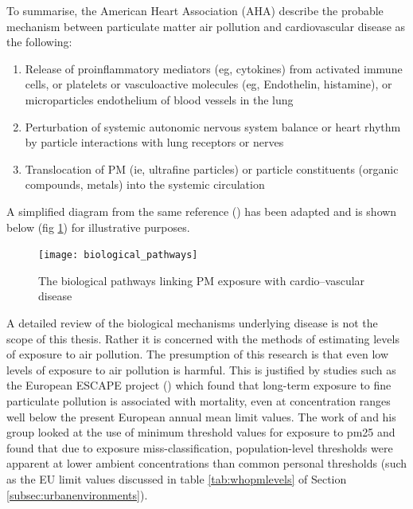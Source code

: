 To summarise, the American Heart Association (AHA) \cite{Brook2010} describe the probable mechanism between particulate matter air pollution and cardiovascular disease as the following:

\begin{enumerate}
  \item Release of proinflammatory mediators (eg, cytokines) from activated immune cells, or platelets or vasculoactive molecules (eg, Endothelin, histamine), or microparticles endothelium of blood vessels in the lung
  \item Perturbation of systemic autonomic nervous system balance or heart rhythm by particle interactions with lung receptors or nerves
  \item Translocation of PM (ie, ultrafine particles) or particle constituents (organic compounds, metals) into the systemic circulation
\end{enumerate}


A simplified diagram from the same reference (\cite{Brook2010}) has been adapted and is shown below (fig \ref{fig:biological_pathways}) for illustrative purposes.

\begin{figure}[H]
\centering
\texttt{[image: biological\_pathways]}
\caption{The biological pathways linking PM exposure with cardio--vascular disease}
\label{fig:biological_pathways}
\end{figure}


A detailed review of the biological mechanisms underlying disease is not the scope of this thesis. Rather it is concerned with the methods of estimating levels of exposure to air pollution. The presumption of this research is that even low levels of exposure to air pollution is harmful. This is justified by studies such as the European ESCAPE project (\cite{Beelen2013}) which found that long-term exposure to fine particulate pollution is associated with mortality, even at concentration ranges well below the present European annual mean limit values. The work of \cite{Brauer2002} and his group looked at the use of minimum threshold values for exposure to \gls{pm25} and found that due to exposure miss-classification, population-level thresholds were apparent at lower ambient concentrations than common personal thresholds (such as the EU limit values discussed in table \ref{tab:whopmlevels} of Section \ref{subsec:urbanenvironments}).

